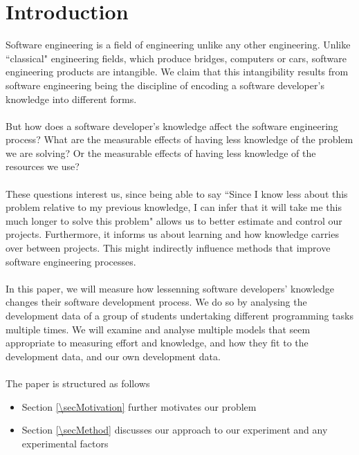 \section{Introduction} \label{secIntro}

Software engineering is a field of engineering unlike any other engineering.
Unlike ``classical" engineering fields, which produce bridges, computers or
cars, software engineering products are intangible.
We claim that this intangibility results from software engineering being the
discipline of encoding a software developer's knowledge into different forms.\\
\\
But how does a software developer's knowledge affect the software engineering
process?
What are the measurable effects of having less knowledge of the problem we are
solving?
Or the measurable effects of having less knowledge of the resources we use?\\
\\
These questions interest us, since being able to say ``Since I know less about
this problem relative to my previous knowledge, I can infer that it will take me
this much longer to solve this problem" allows us to better estimate and control
our projects.
Furthermore, it informs us about learning and how knowledge carries over between
projects.
This might indirectly influence methods that improve software engineering
processes.\\
\\
In this paper, we will measure how lessenning software developers' knowledge
changes their software development process.
We do so by analysing the development data of a group of students undertaking
different programming tasks multiple times.
We will examine and analyse multiple models that seem appropriate to
measuring effort and knowledge, and how they fit to the development data, and
our own development data.\\
\\
The paper is structured as follows
\begin{itemize}
  \item Section \ref{\secMotivation} further motivates our problem
  \item Section \ref{\secMethod} discusses our approach to our experiment and
  any experimental factors
\end{itemize}
